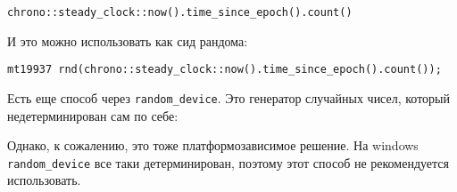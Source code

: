 \verb+chrono::steady_clock::now().time_since_epoch().count()+

И это можно использовать как сид рандома:

\verb+mt19937 rnd(chrono::steady_clock::now().time_since_epoch().count());+

Есть еще способ через \verb+random_device+. Это генератор случайных чисел, который недетерминирован сам по себе:



Однако, к сожалению, это тоже платформозависимое решение. На windows \verb+random_device+ все таки детерминирован, поэтому этот способ не рекомендуется использовать.
